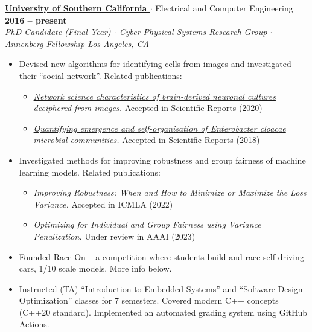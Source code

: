 \documentclass[11pt]{res}
\begin{document}
\begin{resume}
%
%
\textbf{\Large \href{http://viterbi.usc.edu/}{University of Southern California \scriptsize {}}} \enskip $\cdot$ \enskip Electrical and Computer Engineering
\hfill       \textbf{2016 -- present} \enskip \enskip\\
\textit{PhD Candidate (Final Year) \enskip $\cdot$ \enskip Cyber Physical Systems Research Group  \enskip $\cdot$ \enskip {}\enskip Annenberg Fellowship \hfill Los Angeles, CA }

\begin{rightrule}
\begin{itemize}[parsep=0pt]
    \item Devised new algorithms for identifying cells from images and investigated their ``social network''. Related publications:
    \begin{small}
    \begin{itemize}[label={}, left=0pt]
        \item \href{https://www.nature.com/articles/s41598-020-72013-7}{\textit{Network science characteristics of brain-derived neuronal cultures deciphered from images.} Accepted in Scientific Reports (2020) \scriptsize {}}
        \item \href{https://www.nature.com/articles/s41598-018-30654-9}{\textit{Quantifying emergence and self-organisation of Enterobacter cloacae microbial communities.} Accepted in Scientific Reports (2018) \scriptsize {}}
    \end{itemize}
    \end{small}
    \item Investigated methods for improving robustness and group fairness of machine learning models. Related publications:
    \begin{small}
    \begin{itemize}[label={}, left=0pt]
        \item \textit{Improving Robustness: When and How to Minimize or Maximize the Loss Variance.} Accepted in ICMLA (2022)
        \item \textit{Optimizing for Individual and Group Fairness using Variance Penalization.} Under review in AAAI (2023)
    \end{itemize}
    \end{small}
    \item Founded Race On -- a competition where students build and race self-driving cars, 1/10 scale models. More info below.
    \item Instructed (TA) ``Introduction to Embedded Systems'' and ``Software Design Optimization'' classes for 7 semesters. Covered modern C++ concepts (C++20 standard). Implemented an automated grading system using GitHub Actions.


\end{itemize}
\end{rightrule}
\end{resume}
\end{document}
